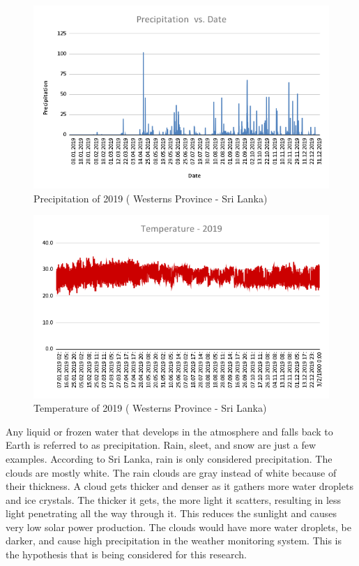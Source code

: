\documentclass[conference]{IEEEtran}
\begin{document}
\begin{figure}[htp]
    \centering
    \includegraphics[width=\linewidth]{Images/Precipitation.png}
    \caption{Precipitation of 2019 ( Westerns Province - Sri Lanka)}
    \label{fig:Precipitation}
\end{figure}

\begin{figure}[htp]
    \centering
    \includegraphics[width=\linewidth]{Images/Temperature - 2019.png}
    \caption{Temperature of 2019 ( Westerns Province - Sri Lanka)}
    \label{fig:Temperature }
\end{figure}


Any liquid or frozen water that develops in the atmosphere and falls back to Earth is referred to as precipitation. Rain, sleet, and snow are just a few examples. \cite{precipitation} According to Sri Lanka, rain is only considered precipitation. The clouds are mostly white. The rain clouds are gray instead of white because of their thickness.  A cloud gets thicker and denser as it gathers more water droplets and ice crystals. The thicker it gets, the more light it scatters, resulting in less light penetrating all the way through it. This reduces the sunlight and causes very low solar power production. The clouds would have more water droplets, be darker, and cause high precipitation in the weather monitoring system. This is the hypothesis that is being considered for this research. 
\end{document}
